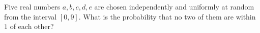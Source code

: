 Five real numbers $a,b,c,d,e$ are chosen independently and uniformly at random from the interval $[0,9]$. What is the probability that no two of them are within $1$ of each other?
